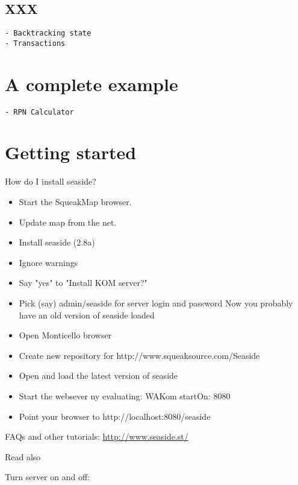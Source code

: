 \documentclass[a4paper,10pt,twoside]{book}
\begin{document}
\subsection{XXX}
\begin{verbatim}
- Backtracking state
- Transactions
\end{verbatim}

\section{A complete example}
\begin{verbatim}
- RPN Calculator
\end{verbatim}

\section{Getting started}

\begin{faq}
How do I install seaside?
\end{faq}
\answer
\begin{itemize}
  \item 
Start the SqueakMap browser.
  \item 
Update map from the net.
  \item 
Install seaside (2.8a)
  \item 
Ignore warnings
  \item 
Say "yes" to "Install KOM server?"
  \item 
Pick (say) admin/seaside for server login and password
Now you probably have an old version of seaside loaded
  \item 
Open Monticello browser
  \item 
Create new repository for http://www.squeaksource.com/Seaside
  \item 
Open and load the latest version of seaside
  \item 
Start the websever ny evaluating:
	WAKom startOn: 8080
  \item 
Point your browser to
	http://localhost:8080/seaside
\end{itemize}

FAQs and other tutorials:
\url{http://www.seaside.st/}

Read also \cite{Duca07a}

Turn server on and off:
\end{document}
